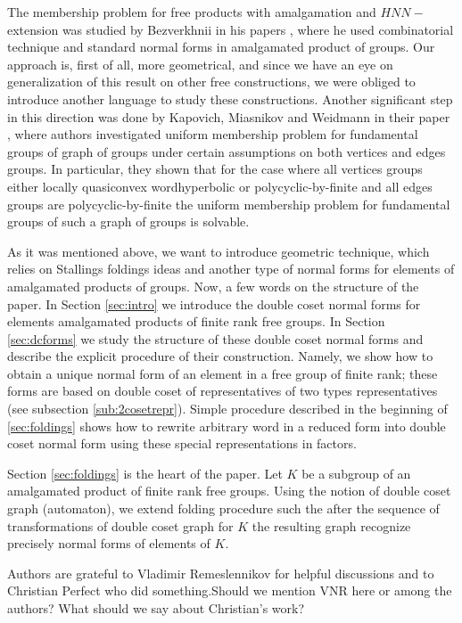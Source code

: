 \documentclass[a4paper,12pt]{article}
\numberwithin{equation}{section}
\numberwithin{figure}{section}
\begin{document}
The membership problem for free products with amalgamation and
$HNN-$extension was studied by Bezverkhnii in his papers
\cite{bez81,bez86,bez90,bez91}, where he used combinatorial
technique and standard normal forms in amalgamated product of
groups. Our approach is, first of all, more geometrical, and since
we have an eye on generalization of this result on other free
constructions, we were obliged to introduce another language to
study these constructions. Another significant step in this
direction was done by Kapovich, Miasnikov and Weidmann in their
paper \cite{KMW03}, where authors investigated uniform membership
problem for fundamental groups of graph of groups under certain
assumptions on both vertices and edges groups. In particular, they
shown that for the case where all vertices groups either locally
quasiconvex wordhyperbolic or polycyclic-by-finite and all edges
groups are polycyclic-by-finite the uniform membership problem for
fundamental groups of such a graph of groups is solvable.

As it was mentioned above, we want to introduce geometric
technique, which relies on Stallings foldings ideas and another
type of normal forms for elements of amalgamated products of
groups. Now, a few words on the structure of the paper. In Section
\ref{sec:intro} we introduce the double coset normal forms for
elements amalgamated products of finite rank free groups.
 In Section \ref{sec:dcforms} we study the structure of these double coset normal forms and describe the explicit procedure
 of their construction. Namely, we show how to obtain a unique normal form of an element in a free group of finite
 rank; these forms are based on double coset of representatives of
 two types representatives (see subsection \ref{sub:2cosetrepr}).
 Simple procedure described in the beginning of \ref{sec:foldings}
 shows how to rewrite arbitrary word in a reduced form into double
 coset normal form using these special representations in factors.

Section  \ref{sec:foldings} is the heart of the paper. Let $K$ be
a subgroup of an amalgamated product of finite rank free groups.
Using the notion of double coset graph (automaton), we extend
folding procedure such the after the sequence of transformations
of double coset graph for $K$ the resulting graph recognize
precisely normal forms of elements of $K$.



Authors are grateful to Vladimir Remeslennikov for helpful
discussions and to Christian Perfect who did something.{\ef Should
we mention VNR here or among the authors? What should we say about
Christian's work?}
\end{document}
